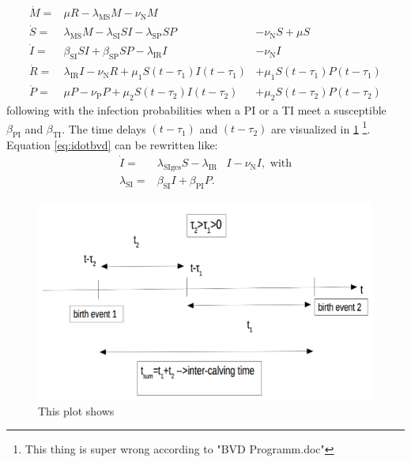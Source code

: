 \begin{eqnarray}
\dot{M}  =& \mu R-\lambda_\text{MS} M -\nu_\text{N} M & \\
\dot{S}  =& \lambda_\text{MS} M - \lambda_\text{SI}SI-\lambda_\text{SP} SP &-\nu_\text{N} S + \mu S \\
\dot{I}  =& \beta_\text{SI}SI+\beta_\text{SP} SP - \lambda_\text{IR} I &- \nu_\text{N} I \label{eq:idotbvd} \\
\dot{R}  =& \lambda_\text{IR}I - \nu_\text{N} R +\mu_1S(t-\tau_1)I(t-\tau_1) &+\mu_1S(t-\tau_1)P(t-\tau_1) \\ 
\dot{P}  =&  \mu P -\nu_\text{P}P + \mu_2S(t-\tau_2)I(t-\tau_2) &+ \mu_2S(t-\tau_2)P(t-\tau_2)
\end{eqnarray}
following \citep{BAS16} with the infection probabilities when a PI or a TI meet a susceptible $\beta_\text{PI}$ and $\beta_\text{TI}$. The time delays $(t-\tau_1)$ and $(t-\tau_2)$ are visualized in \ref{fig:infectionTimeScale} 
\footnote{This thing is super wrong according to "BVD Programm.doc"}. Equation \ref{eq:idotbvd} can be rewritten like:
\begin{eqnarray}
\dot{I}  =& \lambda_\text{SIges}S - \lambda_\text{IR}&I - \nu_\text{N} I, \text{ with} \\
\lambda_\text{SI} =& \beta_\text{SI} I+ \beta_\text{PI} P.& \label{eq:vie04start}
\end{eqnarray}

\begin{figure}[htbp]
\centering
\noindent\includegraphics[width=\linewidth,height=\textheight,
keepaspectratio]{infectionTimeScale.png} \caption[]{This plot shows }
\label{fig:infectionTimeScale}
\end{figure}
